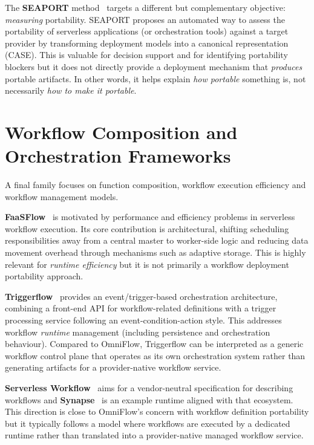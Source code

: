 The \textbf{SEAPORT} method~\cite{yussupov2020seaport} targets a different but complementary objective: \textit{measuring} portability.
SEAPORT proposes an automated way to assess the portability of serverless applications (or orchestration tools) against a target provider by transforming deployment models into a canonical representation (CASE).
This is valuable for decision support and for identifying portability blockers but it does not directly provide a deployment mechanism that \textit{produces} portable artifacts. In other words, it helps explain \textit{how portable} something is, not necessarily \textit{how to make it portable}.

\section{Workflow Composition and Orchestration Frameworks}

A final family focuses on function composition, workflow execution efficiency and workflow management models.

\textbf{FaaSFlow}~\cite{li2022faasflow} is motivated by performance and efficiency problems in serverless workflow execution. Its core contribution is architectural, shifting scheduling responsibilities away from a central master to worker-side logic and reducing data movement overhead through mechanisms such as adaptive storage. This is highly relevant for \textit{runtime efficiency} but it is not primarily a workflow deployment portability approach.

\textbf{Triggerflow}~\cite{garciaLopez2020triggerflow} provides an event/trigger-based orchestration architecture, combining a front-end API for workflow-related definitions with a trigger processing service following an event-condition-action style. This addresses workflow \textit{runtime} management (including persistence and orchestration behaviour). Compared to OmniFlow, Triggerflow can be interpreted as a generic workflow control plane that operates as its own orchestration system rather than generating artifacts for a provider-native workflow service.

\textbf{Serverless Workflow}~\cite{serverlessWorkflowSpec} aims for a vendor-neutral specification for describing workflows and \textbf{Synapse}~\cite{serverlessworkflowSynapse} is an example runtime aligned with that ecosystem. This direction is close to OmniFlow's concern with workflow definition portability but it typically follows a model where workflows are executed by a dedicated runtime rather than translated into a provider-native managed workflow service.

